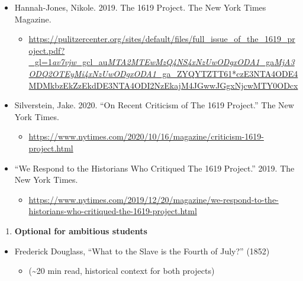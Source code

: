 \documentclass[]{tufte-handout}
\providecommand{\tightlist}{%
  \setlength{\itemsep}{0pt}\setlength{\parskip}{0pt}}
\begin{document}
\begin{itemize}
\tightlist
\item
  Hannah-Jones, Nikole. 2019. The 1619 Project. The New York Times
  Magazine.

  \begin{itemize}
  \tightlist
  \item
    \href{https://pulitzercenter.org/sites/default/files/full_issue_of_the_1619_project.pdf?_gl=1*av7vjw*_gcl_au*MTA2MTEwMzQ4NS4xNzUwODgxODA1*_ga*MjA3ODQ2OTEyMi4xNzUwODgxODA1*_ga_ZYQYTZTT61*czE3NTA4ODE4MDMkbzEkZzEkdDE3NTA4ODI2NzEkajM4JGwwJGgxNjcwMTY0ODcx}{https://pulitzercenter.org/sites/default/files/full\_issue\_of\_the\_1619\_project.pdf?\_gl=1\emph{av7vjw}\_gcl\_au\emph{MTA2MTEwMzQ4NS4xNzUwODgxODA1}\_ga\emph{MjA3ODQ2OTEyMi4xNzUwODgxODA1}\_ga\_ZYQYTZTT61*czE3NTA4ODE4MDMkbzEkZzEkdDE3NTA4ODI2NzEkajM4JGwwJGgxNjcwMTY0ODcx}
  \end{itemize}
\item
  Silverstein, Jake. 2020. ``On Recent Criticism of The 1619 Project.''
  The New York Times.

  \begin{itemize}
  \tightlist
  \item
    \url{https://www.nytimes.com/2020/10/16/magazine/criticism-1619-project.html}
  \end{itemize}
\item
  ``We Respond to the Historians Who Critiqued The 1619 Project.'' 2019.
  The New York Times.

  \begin{itemize}
  \tightlist
  \item
    \url{https://www.nytimes.com/2019/12/20/magazine/we-respond-to-the-historians-who-critiqued-the-1619-project.html}
  \end{itemize}
\end{itemize}

\begin{enumerate}
\def\labelenumi{\arabic{enumi}.}
\setcounter{enumi}{2}
\tightlist
\item
  \textbf{Optional for ambitious students}
\end{enumerate}

\begin{itemize}
\tightlist
\item
  Frederick Douglass, ``What to the Slave is the Fourth of July?''
  (1852)

  \begin{itemize}
  \tightlist
  \item
    (\textasciitilde20 min read, historical context for both projects)
  \end{itemize}
\end{itemize}
\end{document}
